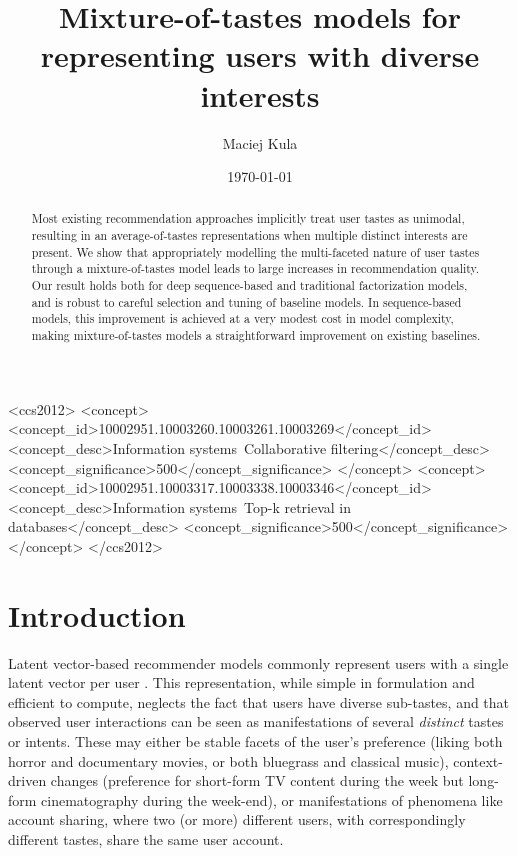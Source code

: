 \documentclass[sigchi]{acmart}
\begin{document}
\title{Mixture-of-tastes models for representing users with diverse interests}
\author{Maciej Kula}
\date{\today}
\acmConference[]{}{}{}

\begin{CCSXML}
<ccs2012>
<concept>
<concept_id>10002951.10003260.10003261.10003269</concept_id>
<concept_desc>Information systems~Collaborative filtering</concept_desc>
<concept_significance>500</concept_significance>
</concept>
<concept>
<concept_id>10002951.10003317.10003338.10003346</concept_id>
<concept_desc>Information systems~Top-k retrieval in databases</concept_desc>
<concept_significance>500</concept_significance>
</concept>
</ccs2012>
\end{CCSXML}




\begin{abstract}
Most existing recommendation approaches implicitly treat user tastes as unimodal, resulting in an average-of-tastes representations when multiple distinct interests are present. We show that appropriately modelling the multi-faceted nature of user tastes through a mixture-of-tastes model leads to large increases in recommendation quality. Our result holds both for deep sequence-based and traditional factorization models, and is robust to careful selection and tuning of baseline models. In sequence-based models, this improvement is achieved at a very modest cost in model complexity, making mixture-of-tastes models a straightforward improvement on existing baselines.
\end{abstract}

\maketitle


\section{Introduction}
Latent vector-based recommender models commonly represent users with a single latent vector per user \citep{koren2009bellkor, hu2008collaborative}. This representation, while simple in formulation and efficient to compute, neglects the fact that users have diverse sub-tastes, and that observed user interactions can be seen as manifestations of several \emph{distinct} tastes or intents. These may either be stable facets of the user's preference (liking both horror and documentary movies, or both bluegrass and classical music), context-driven changes (preference for short-form TV content during the week but long-form cinematography during the week-end), or manifestations of phenomena like account sharing, where two (or more) different users, with correspondingly different tastes, share the same user account.
\end{document}
